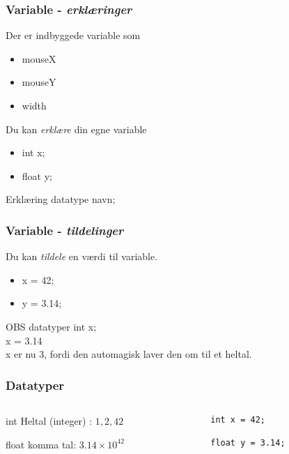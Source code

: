 \documentclass{beamer}
\begin{document}
\begin{frame}
  \frametitle{Variable - \emph{erklæringer}}
  
  Der er indbyggede variable som
  \begin{itemize}
  \item mouseX
  \item mouseY
  \item width
  \end{itemize}

  Du kan \emph{erklære} din egne variable
  \begin{itemize}
  \item int x;
  \item float y;
  \end{itemize}

  \begin{block}{Erklæring}
    datatype navn;
  \end{block}

\end{frame}

\begin{frame}
  \frametitle{Variable - \emph{tildelinger}}
  
  Du kan \emph{tildele} en værdi til variable.
  \begin{itemize}
  \item x = 42;
  \item y = 3.14;
  \end{itemize}


  \begin{block}{OBS datatyper}
    int x; \\
    x = 3.14 \\
    x er nu 3, fordi den automagisk laver den om til et heltal.
  \end{block}

\end{frame}



\begin{frame}[fragile]
  \frametitle{Datatyper}
  \begin{columns}
    \begin{column}{0.4\textwidth}
      \begin{block}{int}
        Heltal (integer) : $1,2,42$
      \end{block}
      \begin{block}{float}
        komma tal: $3.14 \times 10^{42}$
      \end{block}

    \end{column}
    \begin{column}{0.6\textwidth}    
\begin{verbatim}
int x = 42;

float y = 3.14;
\end{verbatim}

    \end{column}
  \end{columns}  
\end{frame}
\end{document}
